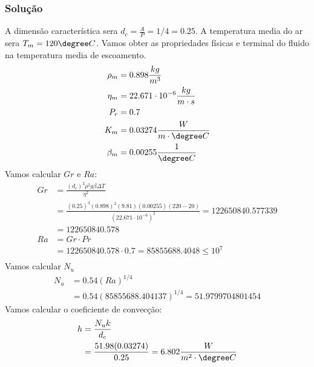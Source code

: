 \subsubsection{Solução}
A dimensão característica sera \(d_{c} = \frac{A}{P} = 1/4 = 0.25\). A temperatura media do ar sera \(T_{m} = 120\degree C\).
Vamos obter as propriedades físicas e terminal do fluido na temperatura media de escoamento.
\begin{align}
    \rho _{m} &= 0.898 \frac{kg}{m^{3} }\\
    \eta _{m} &= 22.671 \cdot 10^{-6}  \frac{kg}{m \cdot s}\\
    P_r &= 0.7\\
    K_{m} &= 0.03274 \frac{W}{m \cdot \degree C}\\
    \beta _{m} &= 0.00255 \frac{1}{\degree C}
\end{align}
Vamos calcular \(Gr\) e \(Ra\):
\begin{align}
    Gr &= \frac{(d_{c} )^{3} \rho ^{2} g \beta \Delta T}{\eta ^{2}}\\
    &= \frac{(0.25)^{3} (0.898)^{2} (9.81) (0.00255) (220 - 20)}{(22.671 \cdot 10^{-6} )^{2}} = 122650840.577339\\
    &= 122650840.578\\
    Ra &= Gr \cdot Pr\\
    &= 122650840.578 \cdot 0.7 = 85855688.4048 \leq 10^7\\
\end{align}
Vamos calcular \(N_{u} \)
\begin{align}
    N_{u} &= 0.54 (Ra)^{1/4}\\
    &= 0.54 (85855688.404137)^{1/4} = 51.9799704801454
\end{align}
Vamos calcular o coeficiente de convecção:
\begin{align}
    h &= \frac{N_{u} k}{d_{c} }\\
    &= \frac{51.98 (0.03274)}{0.25} = 6.802 \frac{W}{m^{2} \cdot \degree C}\\
\end{align}

